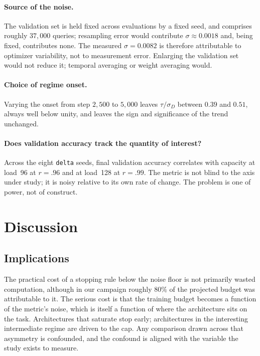 \documentclass[jou,11pt,donotrepeattitle]{apa7}
\begin{document}
\paragraph{Source of the noise.} The validation set is held fixed across evaluations by a fixed
seed, and comprises roughly $37{,}000$ queries; resampling error would contribute $\sigma \approx
0.0018$ and, being fixed, contributes none. The measured $\sigma = 0.0082$ is therefore
attributable to optimizer variability, not to measurement error. Enlarging the validation set
would not reduce it; temporal averaging or weight averaging would.

\paragraph{Choice of regime onset.} Varying the onset from step $2{,}500$ to $5{,}000$ leaves
$\tau/\sigma_D$ between $0.39$ and $0.51$, always well below unity, and leaves the sign and
significance of the trend unchanged.

\paragraph{Does validation accuracy track the quantity of interest?} Across the eight
\texttt{delta} seeds, final validation accuracy correlates with capacity at load~96 at
$r = .96$ and at load~128 at $r = .99$. The metric is not blind to the axis under study; it is
noisy relative to its own rate of change. The problem is one of power, not of construct.

\section{Discussion}

\subsection{Implications}

The practical cost of a stopping rule below the noise floor is not primarily wasted computation,
although in our campaign roughly $80\%$ of the projected budget was attributable to it. The
serious cost is that the training budget becomes a function of the metric's noise, which is
itself a function of where the architecture sits on the task. Architectures that saturate stop
early; architectures in the interesting intermediate regime are driven to the cap. Any
comparison drawn across that asymmetry is confounded, and the confound is aligned with the
variable the study exists to measure.
\end{document}
